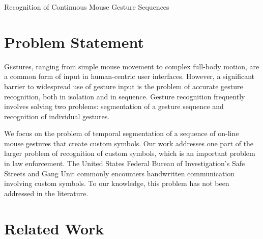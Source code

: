 \documentclass[twoside]{article}
\begin{document}
\centerline{Recognition of Continuous Mouse Gesture Sequences}
\normalsize


\begin{multicols}{2} %

\section{Problem Statement}

\lettrine[nindent=0em,lines=2]{G}estures, ranging from simple mouse movement to
complex full-body motion, are a common form of input in human-centric user
interfaces\cite{mitra_gesture_2007}. However, a significant barrier to
widespread use of gesture input is the problem of accurate gesture recognition,
both in isolation and in sequence. Gesture recognition frequently involves
solving two problems: segmentation of a gesture sequence and recognition of
individual gestures.

We focus on the problem of temporal segmentation of a
sequence of on-line mouse gestures that create custom symbols. Our work
addresses one part of the larger problem of recognition of custom symbols, which
is an important problem in law enforcement. The United States Federal Bureau of
Investigation's Safe Streets and Gang Unit commonly encounters handwritten
communication involving custom symbols\cite{lyddane_donald_united_2006}. To our
knowledge, this problem has not been addressed in the literature.

\section{Related Work}


\end{multicols}
\end{document}
